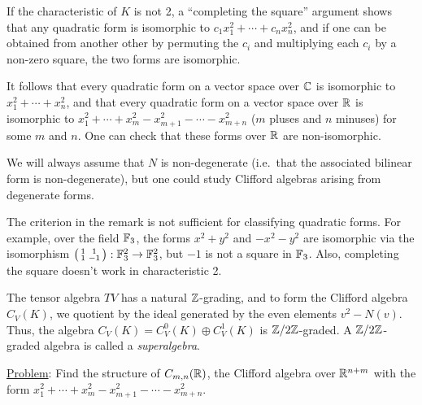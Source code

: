  \begin{remark}\label{lec22Rmk:QuadForm}
   If the characteristic of $K$ is not 2,  a ``completing the square'' argument shows
   that any quadratic form is isomorphic to $c_1x_1^2+\cdots +
   c_nx_n^2$, and if one can be obtained from another other by permuting the $c_i$ and
   multiplying each $c_i$ by a non-zero square, the two forms are isomorphic.

   It follows that every quadratic form on a vector space over $\mathbb{C}$
   is isomorphic to $x_1^2+\cdots +x_n^2$, and that every quadratic form on a
   vector space over $\mathbb{R}$ is isomorphic to $x_1^2+\cdots + x_m^2 - x_{m+1}^2 - \cdots
   - x_{m+n}^2$ ($m$ pluses and $n$ minuses) for some $m$ and $n$. One can check that
   these forms over $\mathbb{R}$ are non-isomorphic.

   We will always assume that $N$ is non-degenerate (i.e.\ that the associated bilinear
   form is non-degenerate), but one could study Clifford algebras arising from degenerate
   forms.
 \end{remark}
 \begin{warning}
   The criterion in the remark is not sufficient for classifying quadratic forms. For
   example, over the field $\mathbb{F}_3$, the forms $x^2+y^2$ and $-x^2-y^2$ are isomorphic
   via the isomorphism $\left( \begin{smallmatrix} 1 & 1 \\ 1 & -1 \end{smallmatrix} \right):\mathbb{F}_3^2\to \mathbb{F}_3^2$, but $-1$ is not a square
   in $\mathbb{F}_3$.  Also, completing the square doesn't work in characteristic 2.
 \end{warning}
 \begin{remark}
   The tensor algebra $TV$ has a natural $\mathbb{Z}$-grading, and to form the Clifford
   algebra $C_V(K)$, we quotient by the ideal generated by the even elements
   $v^2-N(v)$. Thus, the algebra $C_V(K)=C_V^0(K)\oplus C_V^1(K)$ is
   $\mathbb{Z}/2\mathbb{Z}$-graded. A $\mathbb{Z}/2\mathbb{Z}$-graded algebra is called a
   \emph{superalgebra}.
%
 \end{remark}

 \underline{Problem}: Find the structure of $C_{m,n}(\mathbb{R})$, the Clifford algebra over
 $\mathbb{R}^{n+m}$ with the form $x_1^2+\cdots + x_m^2 - x_{m+1}^2 - \cdots - x_{m+n}^2$.

